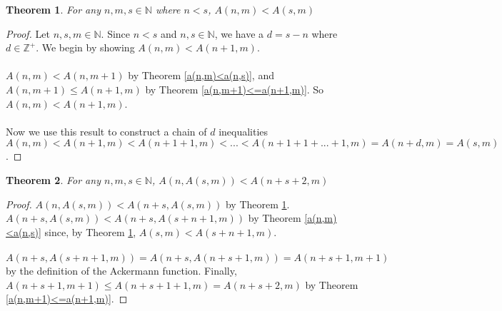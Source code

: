 \documentclass[12pt, letterpaper]{article}
\newtheorem{theorem}{Theorem}
\theoremstyle{case}
\newtheorem{case}{Case}
\begin{document}
    \begin{theorem}
      \label{a(n,m)<a(s,m)}
      For any $n, m, s \in \mathbb{N}$ where $n < s$, $A(n, m) < A(s, m)$
    \end{theorem}
    \begin{proof}
      Let $n, s, m \in \mathbb{N}$.
      Since $n < s$ and $n, s \in \mathbb{N}$, we have a $d = s - n$ where $d \in \mathbb{Z}^+$.
      We begin by showing $A(n, m) < A(n + 1, m)$.
      \\
      \\
      $A(n, m) < A(n, m + 1)$ by Theorem \ref{a(n,m)<a(n,s)},
      and $A(n, m + 1) \leq A(n + 1, m)$ by Theorem \ref{a(n,m+1)<=a(n+1,m)}.
      So $A(n, m) < A(n + 1, m)$.
      \\
      \\
      Now we use this result to construct a chain of $d$ inequalities $A(n, m) < A(n + 1, m) < A(n + 1 + 1, m) < ... < A(n + 1 + 1 + ... + 1, m)
      = A(n + d, m) = A(s, m)$.
    \end{proof}

    \begin{theorem}
      \label{plus2}
      For any $n, m, s \in \mathbb{N}$, $A(n, A(s, m)) < A(n + s + 2, m)$
    \end{theorem}
    \begin{proof}
      $A(n, A(s, m)) < A(n + s, A(s, m))$ by Theorem \ref{a(n,m)<a(s,m)}.
      $A(n + s, A(s, m)) < A(n + s, A(s + n + 1, m))$ by Theorem \ref{a(n,m)<a(n,s)} since, by Theorem \ref{a(n,m)<a(s,m)},
      $A(s, m) < A(s + n + 1, m)$.
      \\
      \\
      $A(n + s, A(s + n + 1, m)) = A(n + s, A(n + s + 1, m)) = A(n + s + 1, m + 1)$ by the definition of the Ackermann function.
      Finally, $A(n + s + 1, m + 1) \leq A(n + s + 1 + 1, m) = A(n + s + 2, m)$ by Theorem \ref{a(n,m+1)<=a(n+1,m)}.
    \end{proof}
\end{document}
